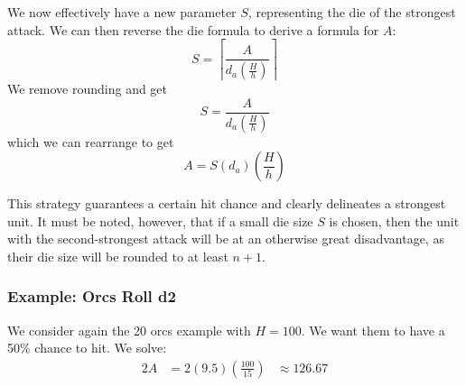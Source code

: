 \documentclass{article}
\begin{document}
We now effectively have a new parameter $S$, representing the die of the strongest attack.
We can then reverse the die formula to derive a formula for $A$:
\[
    S = \left\lceil\frac{A}{d_a(\frac{H}{h})}\right\rceil
\]
We remove rounding and get
\[
    S = \frac{A}{d_a(\frac{H}{h})}
\]
which we can rearrange to get
\[
    A = S(d_a)\left(\frac{H}{h}\right)
\]

This strategy guarantees a certain hit chance and clearly delineates a strongest unit.
It must be noted, however, that if a small die size $S$ is chosen,
then the unit with the second-strongest attack will be at an otherwise great disadvantage,
as their die size will be rounded to at least $n + 1$.


\subsubsection{Example: Orcs Roll d2}

We consider again the 20 orcs example with $H = 100$.
We want them to have a 50\% chance to hit.
We solve:
\begin{alignat*}{2}
    A &= 2(9.5)\left(\frac{100}{15}\right) &{}\approx{} 126.67
\end{alignat*}
\end{document}
